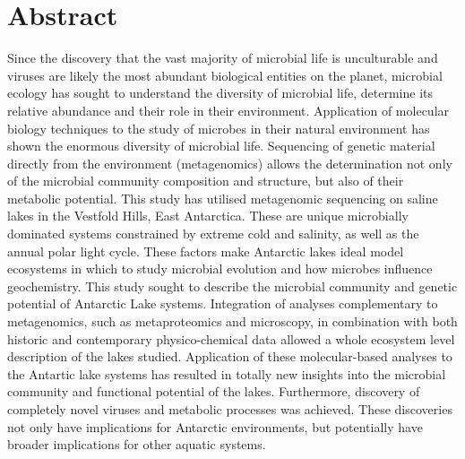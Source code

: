 \chapter*{Abstract}
Since the discovery that the vast majority of microbial life is unculturable and viruses are likely the most abundant biological entities on the planet, microbial ecology has sought to understand the diversity of microbial life, determine its relative abundance and their role in their environment.
Application of molecular biology techniques to the study of microbes in their natural environment has shown the enormous diversity of microbial life.
Sequencing of genetic material directly from the environment (metagenomics) allows the determination not only of the microbial community composition and structure, but also of their metabolic potential.
This study has utilised metagenomic sequencing on saline lakes in the Vestfold Hills, East Antarctica.
These are unique microbially dominated systems constrained by extreme cold and salinity, as well as the annual polar light cycle.
These factors make Antarctic lakes ideal model ecosystems in which to study microbial evolution and how microbes influence geochemistry.
This study sought to describe the microbial community and genetic potential of Antarctic Lake systems.
Integration of analyses complementary to metagenomics, such as metaproteomics and microscopy, in combination with both historic and contemporary physico-chemical data allowed a whole ecosystem level description of the lakes studied.
Application of these molecular-based analyses to the Antartic lake systems has resulted in totally new insights into the microbial community and functional potential of the lakes.
Furthermore, discovery of completely novel viruses and metabolic processes was achieved.
These discoveries not only have implications for Antarctic environments, but potentially have broader implications for other aquatic systems.



